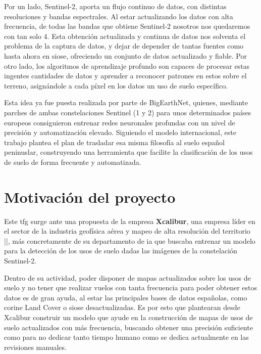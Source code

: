 Por un lado, Sentinel-2, aporta un flujo continuo de datos, con distintas resoluciones y bandas espectrales. Al estar actualizando los datos
con alta frecuencia, de todas las bandas que obtiene Sentinel-2 nosotros nos quedaremos con tan solo 4. Esta obtención actualizada y continua de
datos nos solventa el problema de la captura de datos, y dejar de depender de tantas fuentes como hasta ahora en \acrshort{siose}, ofreciendo un
conjunto de datos actualizado y fiable. Por otro lado, los algoritmos de aprendizaje profundo son capaces de procesar estas ingentes cantidades 
de datos y aprender a reconocer patrones en estos sobre el terreno, asignándole a cada píxel en los datos un uso de suelo específico.


Esta idea ya fue puesta realizada por parte de BigEarthNet, quienes, mediante parches de ambas constelaciones Sentinel (1 y 2) para unos
determinados países europeos consiguieron entrenar redes neuronales profundas con un nivel de precisión y automatización elevado. Siguiendo el
modelo internacional, este trabajo plantea el plan de trasladar esa misma filosofía al suelo español peninuslar, construyendo una herramienta
que facilite la clasificación de los usos de suelo de forma frecuente y automatizada.


\section{Motivación del proyecto}
\label{sec:motivacion}

Este \acrshort{tfg} surge ante una propuesta de la empresa \textbf{Xcalibur}, una empresa líder en el sector de la industria geofísica
aérea y mapeo de alta resolución del territorio |\citet{xcalibur}|, más concretamente de su departamento de \acrshort{ia} que buscaba entrenar un
modelo para la detección de los usos de suelo dadas las imágenes de la constelación Sentinel-2.


Dentro de su actividad, poder disponer de mapas actualizados sobre los usos de suelo y no tener que realizar vuelos con tanta frecuencia para 
poder obtener estos datos es de gran ayuda, al estar las principales bases de datos españolas, como \acrshort{corine} Land Cover o \acrshort{siose} desactualizadas.
Es por esto que plantearan desde Xcalibur construir un modelo que ayude en la construcción de mapas de usos de suelo actualizados con más frecuencia,
buscando obtener una precisión suficiente como para no dedicar tanto tiempo humano como se dedica actualmente en las revisiones manuales.    


